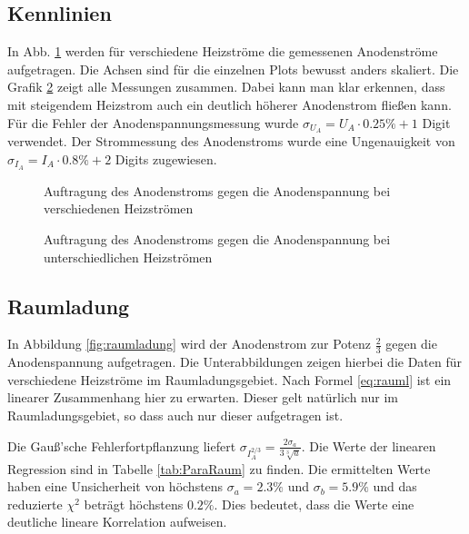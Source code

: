 \documentclass[12pt,a4paper,titlepage,headinclude,bibtotoc]{scrartcl}
\begin{document}
\subsection{Kennlinien}
In Abb. \ref{fig:heiz} werden für verschiedene Heizströme die gemessenen Anodenströme aufgetragen.
Die Achsen sind für die einzelnen Plots bewusst anders skaliert.
Die Grafik \ref{fig:h} zeigt alle Messungen zusammen.
Dabei kann man klar erkennen, dass mit steigendem Heizstrom auch ein deutlich höherer Anodenstrom fließen kann.
Für die Fehler der Anodenspannungsmessung wurde $\sigma_{U_A}=U_A\cdot 0.25\%+1$ Digit verwendet.
Der Strommessung des Anodenstroms wurde eine Ungenauigkeit von $\sigma_{I_A}= I_A\cdot 0.8\%+2$ Digits zugewiesen.
\begin{figure}[h]
  \centering
  \hfill
  \hfill
  \caption{Auftragung des Anodenstroms gegen die Anodenspannung bei verschiedenen Heizströmen}
  \label{fig:heiz}
\end{figure}
\begin{figure}[!h]
	\centering
	
	\caption{Auftragung des Anodenstroms gegen die Anodenspannung bei unterschiedlichen Heizströmen}
	\label{fig:h}
\end{figure}


\subsection{Raumladung}
In Abbildung \ref{fig:raumladung} wird der Anodenstrom zur Potenz $\frac{2}{3}$ gegen die Anodenspannung aufgetragen.
Die Unterabbildungen zeigen hierbei die Daten für verschiedene Heizströme im Raumladungsgebiet.
Nach Formel \eqref{eq:rauml} ist ein linearer Zusammenhang hier zu erwarten.
Dieser gelt natürlich nur im Raumladungsgebiet, so dass auch nur dieser aufgetragen ist.

Die Gauß'sche Fehlerfortpflanzung liefert $\sigma_{I_A^{2/3}}=\frac{2\sigma_{a}}{3\sqrt[3]{a}}$.
Die Werte der linearen Regression sind in Tabelle \ref{tab:ParaRaum} zu finden.
Die ermittelten Werte haben eine Unsicherheit von höchstens $\sigma_a = 2.3\%$ und $\sigma_b=5.9\%$ und das reduzierte $\chi^2$ beträgt höchstens $0.2\%$.
Dies bedeutet, dass die Werte eine deutliche lineare Korrelation aufweisen.
\end{document}
